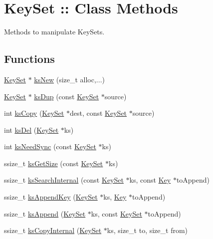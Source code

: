 \hypertarget{group__keyset}{
\section{KeySet :: Class Methods}
\label{group__keyset}
}


Methods to manipulate KeySets.  


\subsection*{Functions}
\begin{DoxyCompactItemize}
\item 
\hyperlink{struct__KeySet}{KeySet} $\ast$ \hyperlink{group__keyset_ga671e1aaee3ae9dc13b4834a4ddbd2c3c}{ksNew} (size\_\-t alloc,...)
\item 
\hyperlink{struct__KeySet}{KeySet} $\ast$ \hyperlink{group__keyset_gac59e4b328245463f1451f68d5106151c}{ksDup} (const \hyperlink{struct__KeySet}{KeySet} $\ast$source)
\item 
int \hyperlink{group__keyset_gaba1f1dbea191f4d7e7eb3e4296ae7d5e}{ksCopy} (\hyperlink{struct__KeySet}{KeySet} $\ast$dest, const \hyperlink{struct__KeySet}{KeySet} $\ast$source)
\item 
int \hyperlink{group__keyset_ga27e5c16473b02a422238c8d970db7ac8}{ksDel} (\hyperlink{struct__KeySet}{KeySet} $\ast$ks)
\item 
int \hyperlink{group__keyset_ga8f210432e664d8ba06d7d55a2aba2d0f}{ksNeedSync} (const \hyperlink{struct__KeySet}{KeySet} $\ast$ks)
\item 
ssize\_\-t \hyperlink{group__keyset_ga7474ad6b0a0fa969dbdf267ba5770eee}{ksGetSize} (const \hyperlink{struct__KeySet}{KeySet} $\ast$ks)
\item 
ssize\_\-t \hyperlink{group__keyset_ga35e8bb0b89ecbc268646fdabdf95d36c}{ksSearchInternal} (const \hyperlink{struct__KeySet}{KeySet} $\ast$ks, const \hyperlink{struct__Key}{Key} $\ast$toAppend)
\item 
ssize\_\-t \hyperlink{group__keyset_gaa5a1d467a4d71041edce68ea7748ce45}{ksAppendKey} (\hyperlink{struct__KeySet}{KeySet} $\ast$ks, \hyperlink{struct__Key}{Key} $\ast$toAppend)
\item 
ssize\_\-t \hyperlink{group__keyset_ga21eb9c3a14a604ee3a8bdc779232e7b7}{ksAppend} (\hyperlink{struct__KeySet}{KeySet} $\ast$ks, const \hyperlink{struct__KeySet}{KeySet} $\ast$toAppend)
\item 
ssize\_\-t \hyperlink{group__keyset_ga4eefd4ca10eacef240b157168443e7fd}{ksCopyInternal} (\hyperlink{struct__KeySet}{KeySet} $\ast$ks, size\_\-t to, size\_\-t from)

\end{DoxyCompactItemize}
